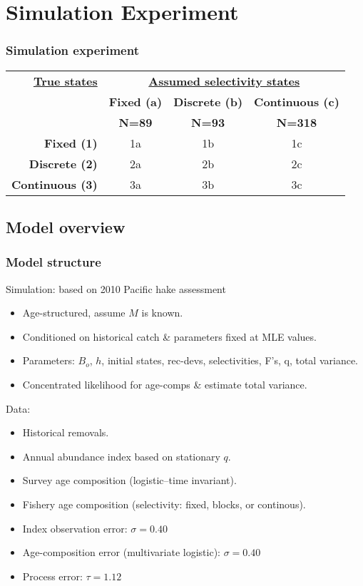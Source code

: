 \documentclass{beamer}
\begin{document}
\section{Simulation Experiment} %
\label{sec:simulation_experiment}


\begin{frame}[m]\frametitle{Simulation experiment}
    
 \begin{tabular}{r|ccc}
		\hline

		\textbf{\textbf{\underline{True states}}}
		&\multicolumn{3}{c}{\textbf{\underline{Assumed selectivity states}}}\\
		&\textbf{Fixed (a)} & \textbf{Discrete (b)} & \textbf{Continuous (c)} \\
		&\textbf{N=89} & \textbf{N=93} & \textbf{N=318} \\
		\hline
		 \textbf{Fixed (1)}      & 1a & 1b & 1c \\
		 \textbf{Discrete (2)}   & 2a & 2b & 2c \\
		 \textbf{Continuous (3)} & 3a & 3b & 3c \\
		\hline


		\hline
		\end{tabular}
\end{frame}
\subsection{Model overview} %
\label{sub:model_overview}

\begin{frame}[t]\frametitle{Model structure}
	Simulation: based on 2010 Pacific hake assessment
    \begin{itemize}
    	\item Age-structured, assume $M$ is known.
    	\item Conditioned on historical catch \& parameters fixed at MLE values.
    	\item Parameters: $B_o$, $h$, initial states, rec-devs, selectivities, F's, q, total variance.
    	\item Concentrated likelihood for age-comps \& estimate total variance.
    \end{itemize}
    \vfill
    Data:
    \begin{itemize}
    	\item Historical removals.
    	\item Annual abundance index based on stationary $q$.
    	\item Survey age composition (logistic--time invariant).
    	\item Fishery age composition (selectivity: fixed, blocks, or continous).
    	\item Index observation error: $\sigma = 0.40$
    	\item Age-composition error (multivariate logistic): $\sigma = 0.40$
    	\item Process error: $\tau = 1.12$
    \end{itemize}
\end{frame}
\end{document}
